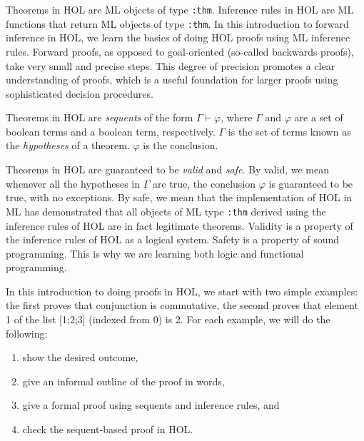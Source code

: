 Theorems in HOL are ML objects of type \texttt{:thm}.  Inference rules
in HOL are ML functions that return ML objects of type
\texttt{:thm}. In this introduction to forward inference in HOL, we
learn the basics of doing HOL proofs using ML inference rules. Forward
proofs, as opposed to goal-oriented (so-called backwards proofs), take
very small and precise steps. This degree of precision promotes a
clear understanding of proofs, which is a useful foundation for larger
proofs using sophisticated decision procedures.

Theorems in HOL are \emph{sequents} of the form $\Gamma \vdash
\varphi$, where $\Gamma$ and $\varphi$ are a set of boolean terms and
a boolean term, respectively. $\Gamma$ is the set of terms known as
the \emph{hypotheses} of a theorem. $\varphi$ is the conclusion.

Theorems in HOL are guaranteed to be \emph{valid} and \emph{safe}. By
valid, we mean whenever all the hypotheses in $\Gamma$ are true, the
conclusion $\varphi$ is guaranteed to be true, with no exceptions. By
safe, we mean that the implementation of HOL in ML has demonstrated
that all objects of ML type \texttt{:thm} derived using the inference
rules of HOL are in fact legitimate theorems. Validity is a property
of the inference rules of HOL as a logical system.  Safety is a
property of sound programming. This is why we are learning both
logic and functional programming.

In this introduction to doing proofs in HOL, we start with two simple
examples: the first proves that conjunction is commutative, the second
proves that element 1 of the list [1;2;3] (indexed from 0) is 2.  For
each example, we will do the following:
\begin{enumerate}
\item show the desired outcome,
\item give an informal outline of the proof in words,
\item give a formal proof using sequents and inference rules, and
\item check the sequent-based proof in HOL.
\end{enumerate}



